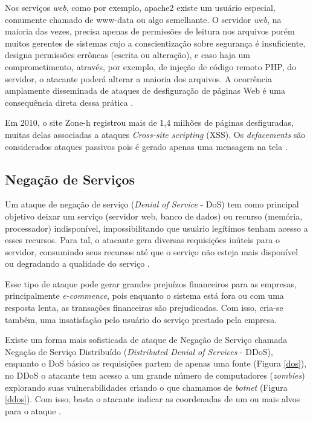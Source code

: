  Nos serviços \textit{web}, como por exemplo, apache2 existe um usuário especial, comumente chamado de www-data ou algo semelhante. O servidor \textit{web}, na maioria das vezes, precisa apenas de permissões de leitura nos arquivos porém muitos gerentes de sistemas cujo a conscientização sobre segurança é insuficiente, designa permissões errôneas (escrita ou alteração), e caso haja um comprometimento, através, por exemplo, de injeção de código remoto PHP, do servidor, o atacante poderá alterar a maioria dos arquivos. A ocorrência amplamente disseminada de ataques de desfiguração de páginas Web é uma consequência direta dessa prática \cite{seguranca:william-lawrie}.

 Em 2010, o site Zone-h registrou mais de 1,4 milhões de páginas desfiguradas, muitas delas associadas a ataques \textit{Cross-site scripting} (XSS). Os \textit{defacements} são considerados ataques passivos pois é gerado apenas uma mensagem na tela \cite{angelo-xss}.

 \subsection{Negação de Serviços} \label{sec:negação}
 
Um ataque de negação de serviço (\textit{Denial of Service} - DoS) tem como principal objetivo deixar um serviço (servidor web, banco de dados) ou recurso (memória, processador)  indisponível, impossibilitando que usuário legítimos tenham acesso a esses recursos. Para tal, o atacante gera diversas requisições inúteis para o servidor, consumindo seus recursos até que o serviço não esteja mais disponível ou degradando a qualidade do serviço \cite{cryptsec}.

Esse tipo de ataque pode gerar grandes prejuízos financeiros para as empresas, principalmente \textit{e-commence}, pois enquanto o sistema está fora ou com uma resposta lenta, as transações financeiras são prejudicadas. Com isso, cria-se também, uma insatisfação pelo usuário do serviço prestado pela empresa.

Existe um forma mais sofisticada de ataque de Negação de Serviço chamada Negação de Serviço Distribuído (\textit{Distributed Denial of Services} - DDoS), enquanto o DoS básico as requisições partem de apenas uma fonte (Figura \ref{dos}), no DDoS o atacante tem acesso a um grande número de computadores (\textit{zombies}) explorando suas vulnerabilidades criando o que chamamos de \textit{botnet} (Figura \ref{ddos}). Com isso, basta o atacante indicar as coordenadas de um ou mais alvos para o ataque \cite{zargarjoshitipper}. 

